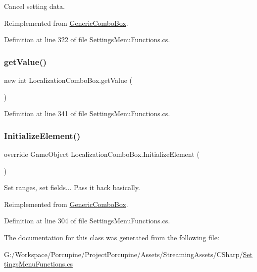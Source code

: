 Cancel setting data. 



Reimplemented from \hyperlink{class_generic_combo_box_a0949a84cf1e33d13346cb90597e005ce}{Generic\+Combo\+Box}.



Definition at line 322 of file Settings\+Menu\+Functions.\+cs.

\mbox{\label{class_localization_combo_box_a710e8525fe4e686e2464030bd380bd85}} 
\subsubsection{\texorpdfstring{get\+Value()}{getValue()}}
{\footnotesize\ttfamily new int Localization\+Combo\+Box.\+get\+Value (\begin{DoxyParamCaption}{ }\end{DoxyParamCaption})}



Definition at line 341 of file Settings\+Menu\+Functions.\+cs.

\mbox{\label{class_localization_combo_box_ab676d6d7fe3c9c9d55259a8aec060622}} 
\subsubsection{\texorpdfstring{Initialize\+Element()}{InitializeElement()}}
{\footnotesize\ttfamily override Game\+Object Localization\+Combo\+Box.\+Initialize\+Element (\begin{DoxyParamCaption}{ }\end{DoxyParamCaption})\hspace{0.3cm}{\ttfamily [virtual]}}



Set ranges, set fields... Pass it back basically. 



Reimplemented from \hyperlink{class_generic_combo_box_ae1800a7c68d3af046a2b147e117437ff}{Generic\+Combo\+Box}.



Definition at line 304 of file Settings\+Menu\+Functions.\+cs.



The documentation for this class was generated from the following file\+:\begin{DoxyCompactItemize}
\item 
G\+:/\+Workspace/\+Porcupine/\+Project\+Porcupine/\+Assets/\+Streaming\+Assets/\+C\+Sharp/\hyperlink{_settings_menu_functions_8cs}{Settings\+Menu\+Functions.\+cs}\end{DoxyCompactItemize}
